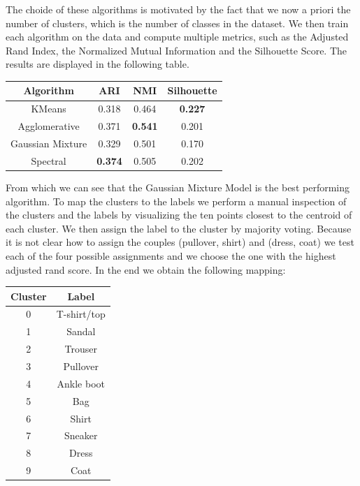 The choide of these algorithms is motivated by the fact that we now
a priori the number of clusters, which is the number of classes in the
dataset. We then train each algorithm on the data and compute multiple
metrics, such as the Adjusted Rand Index, the Normalized Mutual Information and
the Silhouette Score. The results are displayed in the following table.
\begin{table}[H]
    \centering
    \begin{tabular}{|c|c|c|c|}
        \hline
        Algorithm          & ARI   & NMI   & Silhouette \\
        \hline
        KMeans             & 0.318 & 0.464 & \textbf{0.227} \\
        Agglomerative      & 0.371 & \textbf{0.541} & 0.201 \\
        Gaussian Mixture   & 0.329 & 0.501 & 0.170 \\
        Spectral           & \textbf{0.374} & 0.505 & 0.202 \\
        \hline
    \end{tabular}
\end{table}

From which we can see that the Gaussian Mixture Model is the best 
performing algorithm.
To map the clusters to the labels we perform a manual inspection of the
clusters and the labels by visualizing the ten points closest to the
centroid of each cluster. We then assign the label to the cluster by
majority voting. 
Because it is not clear how to assign the couples (pullover, shirt) and (dress, coat)
we test each of the four possible assignments and we choose the one with 
the highest adjusted rand score.
In the end we obtain the following mapping:
\begin{table}[H]
    \centering
    \begin{tabular}{|c|c|}
        \hline
        Cluster & Label \\
        \hline
        0       & T-shirt/top \\
        1       & Sandal \\
        2       & Trouser \\
        3       & Pullover \\
        4       & Ankle boot \\
        5       & Bag \\
        6       & Shirt \\
        7       & Sneaker \\
        8       & Dress \\
        9       & Coat \\
        \hline
    \end{tabular}
\end{table}

